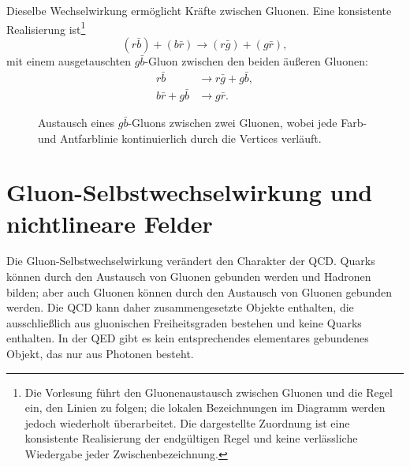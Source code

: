 Dieselbe Wechselwirkung ermöglicht Kräfte zwischen Gluonen. Eine konsistente Realisierung ist\footnote{Die Vorlesung führt den Gluonenaustausch zwischen Gluonen und die Regel ein, den Linien zu folgen; die lokalen Bezeichnungen im Diagramm werden jedoch wiederholt überarbeitet. Die dargestellte Zuordnung ist eine konsistente Realisierung der endgültigen Regel und keine verlässliche Wiedergabe jeder Zwischenbezeichnung.}
\begin{equation}
(r\bar b)+(b\bar r)
\longrightarrow
(r\bar g)+(g\bar r),
\end{equation}
mit einem ausgetauschten \(g\bar b\)-Gluon zwischen den beiden äußeren Gluonen:
\begin{align}
r\bar b&\longrightarrow r\bar g+g\bar b,\\
b\bar r+g\bar b&\longrightarrow g\bar r.
\end{align}

\begin{figure}[h]
\centering
{}
\caption{Austausch eines \(g\bar b\)-Gluons zwischen zwei Gluonen, wobei jede Farb- und Antfarblinie kontinuierlich durch die Vertices verläuft.}
\end{figure}

\section{Gluon-Selbstwechselwirkung und nichtlineare Felder}

Die Gluon-Selbstwechselwirkung verändert den Charakter der QCD. Quarks können durch den Austausch von Gluonen gebunden werden und Hadronen bilden; aber auch Gluonen können durch den Austausch von Gluonen gebunden werden. Die QCD kann daher zusammengesetzte Objekte enthalten, die ausschließlich aus gluonischen Freiheitsgraden bestehen und keine Quarks enthalten. In der QED gibt es kein entsprechendes elementares gebundenes Objekt, das nur aus Photonen besteht.

